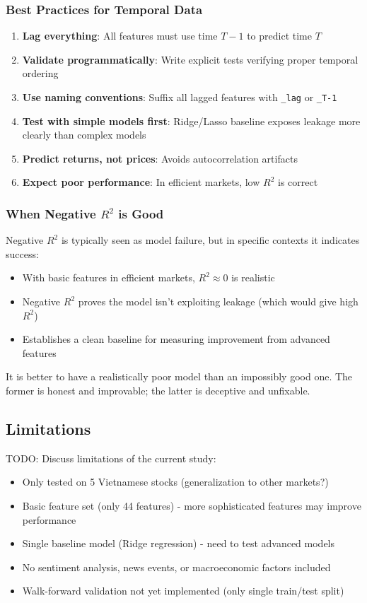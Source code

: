 \documentclass[conference]{IEEEtran}
\begin{document}
\subsubsection{Best Practices for Temporal Data}

\begin{enumerate}
    \item \textbf{Lag everything}: All features must use time $T-1$ to predict time $T$
    \item \textbf{Validate programmatically}: Write explicit tests verifying proper temporal ordering
    \item \textbf{Use naming conventions}: Suffix all lagged features with \texttt{\_lag} or \texttt{\_T-1}
    \item \textbf{Test with simple models first}: Ridge/Lasso baseline exposes leakage more clearly than complex models
    \item \textbf{Predict returns, not prices}: Avoids autocorrelation artifacts
    \item \textbf{Expect poor performance}: In efficient markets, low $R^2$ is correct
\end{enumerate}

\subsubsection{When Negative $R^2$ is Good}

Negative $R^2$ is typically seen as model failure, but in specific contexts it indicates success:

\begin{itemize}
    \item With basic features in efficient markets, $R^2 \approx 0$ is realistic
    \item Negative $R^2$ proves the model isn't exploiting leakage (which would give high $R^2$)
    \item Establishes a clean baseline for measuring improvement from advanced features
\end{itemize}

It is better to have a realistically poor model than an impossibly good one. The former is honest and improvable; the latter is deceptive and unfixable.

\subsection{Limitations}

TODO: Discuss limitations of the current study:
\begin{itemize}
    \item Only tested on 5 Vietnamese stocks (generalization to other markets?)
    \item Basic feature set (only 44 features) - more sophisticated features may improve performance
    \item Single baseline model (Ridge regression) - need to test advanced models
    \item No sentiment analysis, news events, or macroeconomic factors included
    \item Walk-forward validation not yet implemented (only single train/test split)
\end{itemize}
\end{document}
